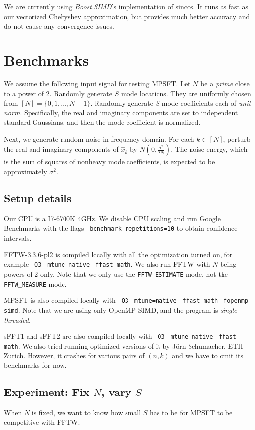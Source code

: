 \documentclass[10pt]{article}
\begin{document}
We are currently using \emph{Boost.SIMD}'s \cite{Esterie:2014:BGP:2568058.2568063} implementation of sincos. It runs as fast as our vectorized Chebyshev approximation, but provides much better accuracy and do not cause any convergence issues.

\section{Benchmarks}

We assume the following input signal for testing MPSFT. Let $N$ be a \emph{prime} close to a power of $2$. Randomly generate $S$ mode locations. They are uniformly chosen from $[N]=\{0,1,\ldots,N-1\}$. Randomly generate $S$ mode coefficients each of \emph{unit norm}. Specifically, the real and imaginary components are set to independent standard Gaussians, and then the mode coefficient is normalized.

Next, we generate random noise in frequency domain. For each $k\in [N]$, perturb the real and imaginary components of $\hat{x}_k$ by $N(0, \frac{\sigma^2}{2N})$. The noise energy, which is the sum of squares of nonheavy mode coefficients, is expected to be approximately $\sigma^2$.

\subsection{Setup details}
Our CPU is a I7-6700K 4GHz. We disable CPU scaling and run Google Benchmarks with the flags \texttt{--benchmark\_repetitions=10} to obtain confidence intervals.

FFTW-3.3.6-pl2 is compiled locally with all the optimization turned on, for example \texttt{-O3} \texttt{-mtune-native} \texttt{-ffast-math}. We also run FFTW with $N$ being powers of $2$ only. Note that we only use the \texttt{FFTW\_ESTIMATE} mode, not the \texttt{FFTW\_MEASURE} mode.

MPSFT is also compiled locally with \texttt{-O3} \texttt{-mtune=native} \texttt{-ffast-math} \texttt{-fopenmp-simd}. Note that we are using only OpenMP SIMD, and the program is \emph{single-threaded}.

sFFT1 and sFFT2 are also compiled locally with \texttt{-O3} \texttt{-mtune-native} \texttt{-ffast-math}. We also tried running optimized versions of it by Jörn Schumacher, ETH Zurich. However, it crashes for various pairs of $(n,k)$ and we have to omit its benchmarks for now.

\subsection{Experiment: Fix $N$, vary $S$}
When $N$ is fixed, we want to know how small $S$ has to be for MPSFT to be competitive with FFTW.
\end{document}
